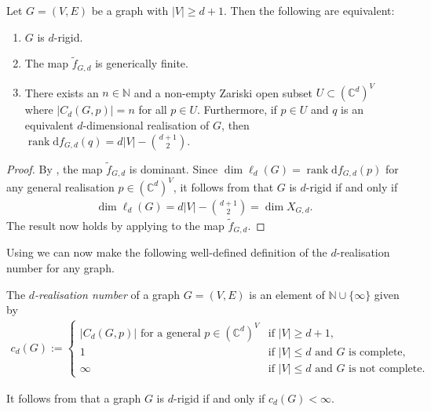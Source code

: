 \documentclass[ALCO]{cedram}
\DeclareMathOperator{\rank}{rank}
\newcommand{\diff}{\mathrm{d}}
\begin{document}
\begin{proposition}\label{p:dom}
	Let $G=(V,E)$ be a graph with $|V| \geq d+1$.
	Then the following are equivalent:
	\begin{enumerate}
		\item\label{p:dom1} $G$ is $d$-rigid.
		\item\label{p:dom2} The map $\tilde{f}_{G,d}$ is generically finite.
		\item\label{p:dom3} There exists an $n \in \mathbb{N}$ and a non-empty Zariski open subset $U \subset (\mathbb{C}^d)^V$ where $ |C_d(G,p)|=n$ for all $p \in U$.
		Furthermore,
		if $p \in U$ and $q$ is an equivalent $d$-dimensional realisation of $G$,
		then $\rank \diff f_{G,d}(q) =  d|V| - \binom{d+1}{2}$.
	\end{enumerate}
\end{proposition} 

\begin{proof}
	By ,
	the map $\tilde{f}_{G,d}$ is dominant.	
	Since $\dim \ell_d(G) = \rank \diff f_{G,d}(p)$ for any general realisation $p\in (\mathbb{C}^d)^V$,
	it follows from  that $G$ is $d$-rigid if and only if 
	\begin{align*}
		\dim \ell_d(G) = d|V|- \binom{d+1}{2} = \dim X_{G,d}.
	\end{align*}
	The result now holds by applying  to the map $\tilde{f}_{G,d}$.
\end{proof}

Using  we can now make the following well-defined definition of the $d$-realisation number for any graph.

\begin{definition}\label{def:count}
	The \emph{$d$-realisation number} of a graph $G=(V,E)$ is an element of $\mathbb{N} \cup \{\infty\}$ given by
	\begin{align*}
		c_d(G) :=		
		\begin{cases}
			|C_d(G,p)| \text{ for a general $p \in (\mathbb{C}^d)^V$} &\text{if } |V| \geq d+1, \\
			 1 &\text{if } |V| \leq d \text{ and $G$ is complete}, \\
			 \infty &\text{if } |V| \leq d \text{ and $G$ is not complete}.
		\end{cases}
	\end{align*}
\end{definition}

It follows from  that a graph $G$ is $d$-rigid if and only if $c_d(G) < \infty$.
\end{document}
